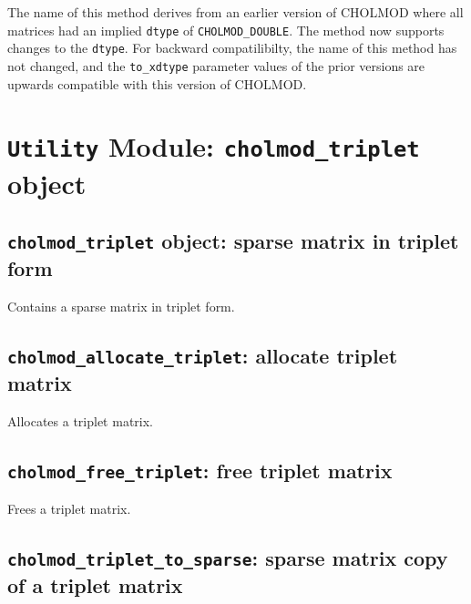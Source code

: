 \documentclass[11pt]{article}
\begin{document}
The name of this method derives from an earlier version of CHOLMOD where all
matrices had an implied \verb'dtype' of \verb'CHOLMOD_DOUBLE'.  The method now
supports changes to the \verb'dtype'.  For backward compatilibilty, the name of
this method has not changed, and the \verb'to_xdtype' parameter values of the
prior versions are upwards compatible with this version of CHOLMOD.

\newpage \section{{\tt Utility} Module: {\tt cholmod\_triplet} object}
\label{cholmod_triplet}

\subsection{{\tt cholmod\_triplet} object: sparse matrix in triplet form}


Contains a sparse matrix in triplet form.

\subsection{{\tt cholmod\_allocate\_triplet}: allocate triplet matrix}


Allocates a triplet matrix.

\subsection{{\tt cholmod\_free\_triplet}: free triplet matrix}


Frees a triplet matrix.

\subsection{{\tt cholmod\_triplet\_to\_sparse}: sparse matrix copy of a triplet
matrix}
\end{document}
